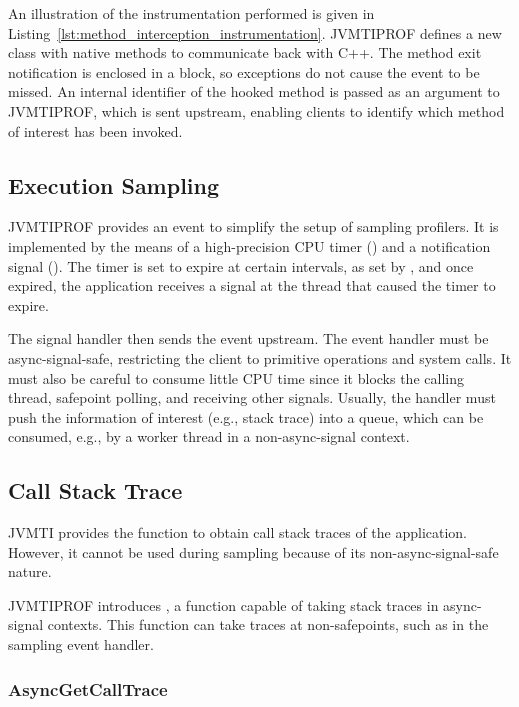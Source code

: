 An illustration of the instrumentation performed is given in Listing~\ref{lst:method_interception_instrumentation}. JVMTIPROF defines a new class with native methods to communicate back with C++. The method exit notification is enclosed in a  block, so exceptions do not cause the event to be missed. An internal identifier of the hooked method is passed as an argument to JVMTIPROF, which is sent upstream, enabling clients to identify which method of interest has been invoked.

\subsection{Execution Sampling}

JVMTIPROF provides an event to simplify the setup of sampling profilers. It is implemented by the means of a high-precision CPU timer () and a notification signal (). The timer is set to expire at certain intervals, as set by , and once expired, the application receives a signal at the thread that caused the timer to expire.

The signal handler then sends the event upstream. The event handler must be async-signal-safe, restricting the client to primitive operations and system calls. It must also be careful to consume little CPU time since it blocks the calling thread, safepoint polling, and receiving other signals. Usually, the handler must push the information of interest (e.g., stack trace) into a queue, which can be consumed, e.g., by a worker thread in a non-async-signal context.

\subsection{Call Stack Trace} \label{sec:impl_callstacktrace}

JVMTI provides the  function to obtain call stack traces of the application. However, it cannot be used during sampling because of its non-async-signal-safe nature.

JVMTIPROF introduces , a function capable of taking stack traces in async-signal contexts. This function can take traces at non-safepoints, such as in the sampling event handler.

\subsubsection*{AsyncGetCallTrace}

